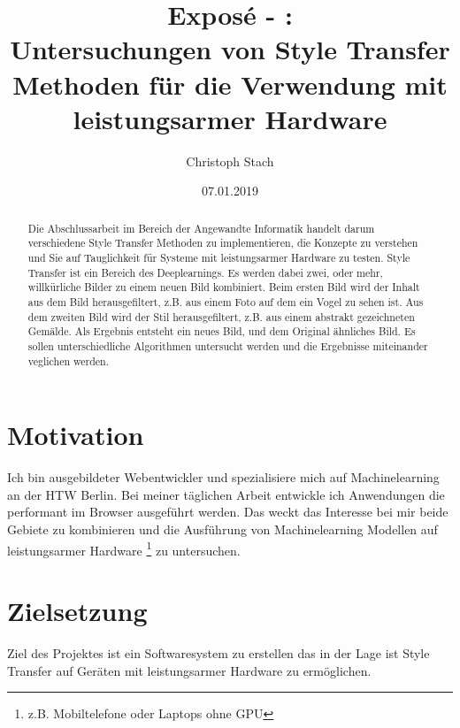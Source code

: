 


\title{\bf Exposé - \@exposeType:\protect\\ Untersuchungen von Style Transfer Methoden für die Verwendung mit leistungsarmer Hardware}
\author{Christoph Stach}
\date{07.01.2019}



\maketitle

\begin{otherlanguage}{ngerman}
	\begin{abstract}
		Die Abschlussarbeit im Bereich der Angewandte Informatik handelt darum verschiedene Style Transfer Methoden zu implementieren,
		die Konzepte zu verstehen und Sie auf Tauglichkeit für Systeme mit leistungsarmer Hardware zu testen. Style Transfer ist ein Bereich des 
		Deeplearnings. Es werden dabei zwei, oder mehr, willkürliche Bilder zu einem neuen Bild kombiniert. Beim ersten Bild wird der Inhalt aus
		dem Bild herausgefiltert, z.B. aus einem Foto auf dem ein Vogel zu sehen ist. Aus dem zweiten Bild wird der Stil herausgefiltert, 
		z.B. aus einem abstrakt gezeichneten Gemälde. Als Ergebnis entsteht ein neues Bild, und dem Original ähnliches Bild. Es sollen 
		unterschiedliche Algorithmen untersucht werden und die Ergebnisse miteinander veglichen werden.
	\end{abstract}
\end{otherlanguage}

\pagebreak

\section{Motivation}
Ich bin ausgebildeter Webentwickler und spezialisiere mich auf Machinelearning an der HTW Berlin. Bei meiner täglichen Arbeit
entwickle ich Anwendungen die performant im Browser ausgeführt werden. Das weckt das Interesse bei mir beide Gebiete zu kombinieren
und die Ausführung von Machinelearning Modellen auf leistungsarmer Hardware \footnote{z.B. Mobiltelefone oder Laptops ohne GPU} zu untersuchen.

\section{Zielsetzung}
Ziel des Projektes ist ein Softwaresystem zu erstellen das in der Lage ist
Style Transfer auf Geräten mit leistungsarmer Hardware zu ermöglichen.

